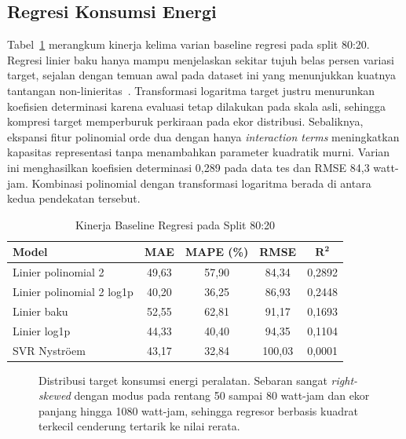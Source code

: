 \documentclass[conference]{IEEEtran}
\begin{document}
\subsection{Regresi Konsumsi Energi}
Tabel~\ref{tab:energy_baseline} merangkum kinerja kelima varian baseline regresi pada split 80:20. Regresi linier baku hanya mampu menjelaskan sekitar tujuh belas persen variasi target, sejalan dengan temuan awal pada dataset ini yang menunjukkan kuatnya tantangan non-linieritas~\cite{Candanedo2017,Pham2020Energy}. Transformasi logaritma target justru menurunkan koefisien determinasi karena evaluasi tetap dilakukan pada skala asli, sehingga kompresi target memperburuk perkiraan pada ekor distribusi. Sebaliknya, ekspansi fitur polinomial orde dua dengan hanya \textit{interaction terms} meningkatkan kapasitas representasi tanpa menambahkan parameter kuadratik murni. Varian ini menghasilkan koefisien determinasi 0{,}289 pada data tes dan RMSE 84{,}3 watt-jam. Kombinasi polinomial dengan transformasi logaritma berada di antara kedua pendekatan tersebut.

\begin{table}[t]
\caption{Kinerja Baseline Regresi pada Split 80:20}
\label{tab:energy_baseline}
\centering
\renewcommand{\arraystretch}{1.15}
\setlength{\tabcolsep}{3pt}
\begin{tabular}{lcccc}
\toprule
\textbf{Model} & \textbf{MAE} & \textbf{MAPE (\%)} & \textbf{RMSE} & $\mathbf{R^2}$ \\
\midrule
Linier polinomial 2          & 49{,}63 & 57{,}90 & 84{,}34 & 0{,}2892 \\
Linier polinomial 2 log1p    & 40{,}20 & 36{,}25 & 86{,}93 & 0{,}2448 \\
Linier baku                  & 52{,}55 & 62{,}81 & 91{,}17 & 0{,}1693 \\
Linier log1p                 & 44{,}33 & 40{,}40 & 94{,}35 & 0{,}1104 \\
SVR Nystr\"oem               & 43{,}17 & 32{,}84 & 100{,}03 & 0{,}0001 \\
\bottomrule
\end{tabular}
\end{table}

\begin{figure}[t]
\centering

\caption{Distribusi target konsumsi energi peralatan. Sebaran sangat \textit{right-skewed} dengan modus pada rentang 50 sampai 80 watt-jam dan ekor panjang hingga 1080 watt-jam, sehingga regresor berbasis kuadrat terkecil cenderung tertarik ke nilai rerata.}
\label{fig:energy_target}
\end{figure}
\end{document}
